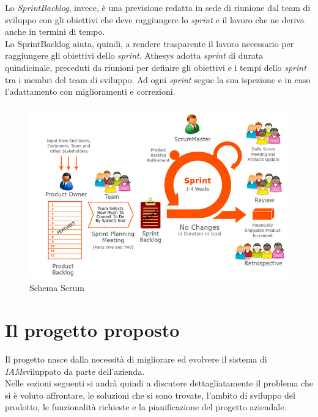 Lo \emph{\gls{SprintBacklog}}\glsfirstoccur, invece, è una previsione redatta in sede di riunione dal team di sviluppo con gli obiettivi che deve raggiungere lo \textit{sprint} e il lavoro che ne deriva anche in termini di tempo.\\
Lo \gls{SprintBacklog} aiuta, quindi, a rendere trasparente il lavoro necessario per raggiungere gli obiettivi dello \textit{sprint}.
Athesys adotta \textit{sprint} di durata quindicinale, preceduti da riunioni per definire gli obiettivi e i tempi dello \textit{sprint} tra i membri del team di sviluppo. Ad ogni \textit{sprint} segue la sua ispezione e in caso l'adattamento con miglioramenti e correzioni.
\begin{figure}[!h]
	\centering
	\includegraphics[scale=0.35]{immagini/scrum}
	\caption{Schema Scrum}
	\label{img:scrum}
\end{figure}
\section{Il progetto proposto}
Il progetto nasce dalla necessità di migliorare ed evolvere il sistema di \emph{\gls{IAM}}\glsfirstoccur sviluppato da parte dell'azienda.\\
Nelle sezioni seguenti si andrà quindi a discutere dettagliatamente il problema che si è voluto affrontare, le soluzioni che si sono trovate, l'ambito di sviluppo del prodotto, le funzionalità richieste e la pianificazione del progetto aziendale.

